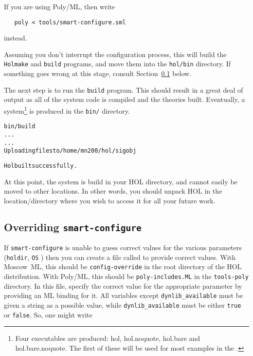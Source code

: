 If you are using Poly/ML, then write
\begin{verbatim}
   poly < tools/smart-configure.sml
\end{verbatim}
instead.

Assuming you don't interrupt the configuration process, this will
build the \texttt{Holmake} and \texttt{build} programs, and move them
into the \texttt{hol/bin} directory.  If something goes wrong at this
stage, consult Section~\ref{sec:editting-configure} below.

The next step is to run the \texttt{build} program.  This should
result in a great deal of output as all of the system code is compiled
and the theories built.  Eventually, a \HOL{} system\footnote{Four
  \HOL{} executables are produced: \textsf{hol}, \textsf{hol.noquote},
  \textsf{hol.bare} and \textsf{hol.bare.noquote}.  The first of these
  will be used for most examples in the \TUTORIAL{}.} is produced in
the \texttt{bin/} directory.

\begin{session}
\begin{alltt}
\dol bin/build
  ...
  ...
Uploading files to /home/mn200/hol/sigobj

Hol built successfully.
\dol
\end{alltt}
\end{session}

At this point, the system is build in your HOL directory, and cannot easily be moved to other locations.
In other words, you should unpack HOL in the location/directory where you wish to access it for all your future work.



\subsection{Overriding \texttt{smart-configure}}
\label{sec:editting-configure}

If \texttt{smart-configure} is unable to guess correct values for the
various parameters (\texttt{holdir}, \texttt{OS} \etc) then you can
create a file called to provide correct values.  With Moscow~ML, this
should be \texttt{config-override} in the root directory of the HOL
distribution.  With Poly/ML, this should be \texttt{poly-includes.ML}
in the \texttt{tools-poly} directory. In this file, specify the
correct value for the appropriate parameter by providing an ML binding
for it.  All variables except \texttt{dynlib\_available} must be given
a string as a possible value, while \texttt{dynlib\_available} must be
either \texttt{true} or \texttt{false}.  So, one might write

